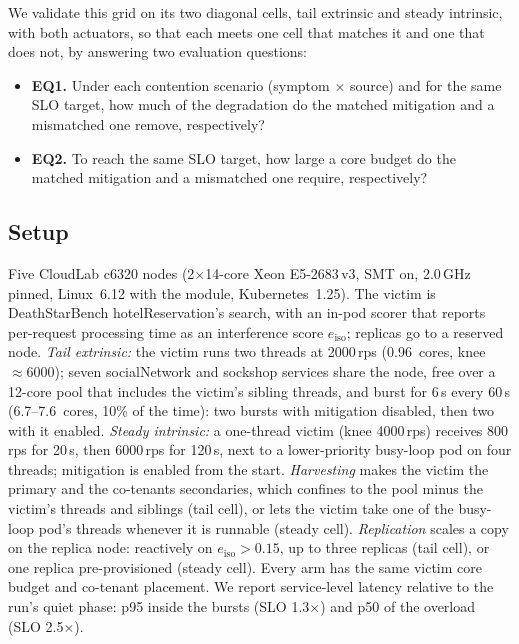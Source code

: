 We validate this grid on its two diagonal cells, tail extrinsic and
steady intrinsic, with both actuators, so that each meets one cell that
matches it and one that does not, by answering two evaluation questions:
\begin{itemize}
  \item \textbf{EQ1.} Under each contention scenario (symptom $\times$
  source) and for the same SLO target, how much of the degradation do the
  matched mitigation and a mismatched one remove, respectively?
  \item \textbf{EQ2.} To reach the same SLO target, how large a core budget
  do the matched mitigation and a mismatched one require, respectively?
\end{itemize}

\subsection{Setup}
\label{sec:motiv-setup}

Five CloudLab c6320 nodes (2$\times$14-core Xeon E5-2683\,v3, SMT on,
2.0\,GHz pinned, Linux~6.12 with the \hc module, Kubernetes~1.25). The
victim is DeathStarBench \textsf{hotelReservation}'s \textsf{search}, with
an in-pod scorer that reports per-request processing time as an
interference score $e_{\mathrm{iso}}$; replicas go to a reserved node.
\emph{Tail extrinsic:} the victim runs two threads at 2000\,rps (0.96~cores,
knee ${\approx}6000$); seven \textsf{socialNetwork} and \textsf{sockshop}
services share the node, free over a 12-core pool that includes the
victim's sibling threads, and burst for 6\,s every 60\,s (6.7--7.6~cores,
10\% of the time): two bursts with mitigation disabled, then two with it
enabled. \emph{Steady intrinsic:} a one-thread victim (knee 4000\,rps)
receives 800\,rps for 20\,s, then 6000\,rps for 120\,s, next to a
lower-priority busy-loop pod on four threads; mitigation is enabled from
the start. \emph{Harvesting} makes the victim the \hc primary and the
co-tenants secondaries, which \hc confines to the pool minus the victim's
threads and siblings (tail cell), or lets the victim take one of the
busy-loop pod's threads whenever it is runnable (steady cell).
\emph{Replication} scales a copy on the replica node: reactively on
$e_{\mathrm{iso}}>0.15$, up to three replicas (tail cell), or one replica
pre-provisioned (steady cell). Every arm has the same victim core budget
and co-tenant placement. We report service-level latency relative to the
run's quiet phase: p95 inside the bursts (SLO 1.3$\times$) and p50 of the
overload (SLO 2.5$\times$).

